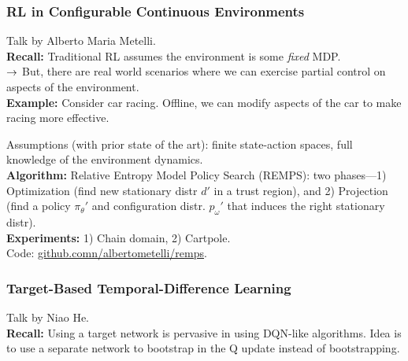 \subsubsection{RL in Configurable Continuous Environments~\cite{metelli2019reinforcement}}

Talk by Alberto Maria Metelli. \\

{\bf Recall:} Traditional RL assumes the environment is some {\it fixed} MDP. \\

$\rightarrow$ But, there are real world scenarios where we can exercise partial control on aspects of the environment. \\

{\bf Example:} Consider car racing. Offline, we can modify aspects of the car to make racing more effective. \\


Assumptions (with prior state of the art): finite state-action spaces, full knowledge of the environment dynamics. \\

{\bf Algorithm:} Relative Entropy Model Policy Search (REMPS): two phases---1) Optimization (find new stationary distr $d'$ in a trust region), and 2) Projection (find a policy $\pi_\theta'$ and configuration distr. $p_\omega'$ that induces the right stationary distr). \\

{\bf Experiments:} 1) Chain domain, 2) Cartpole. \\

Code: \url{github.comn/albertometelli/remps}.

\spacerule

\subsubsection{Target-Based Temporal-Difference Learning~\cite{lee2019target}}

Talk by Niao He. \\

{\bf Recall:} Using a target network is pervasive in using DQN-like algorithms. Idea is to use a separate network to bootstrap in the Q update instead of bootstrapping. \\

